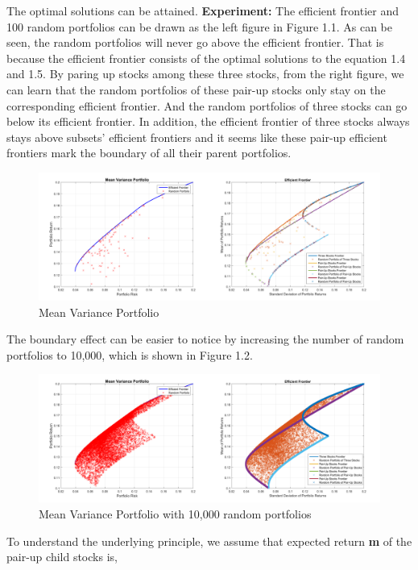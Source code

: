 \documentclass[paper=a4, fontsize=11pt]{article} %
\numberwithin{equation}{section} %
\numberwithin{figure}{section} %
\numberwithin{table}{section} %
\begin{document}
The optimal solutions can be attained.
\newpage
\textbf{Experiment: } The efficient frontier and 100 random portfolios can be drawn as the left figure in Figure 1.1. As can be seen, the random portfolios will never go above the efficient frontier. That is because the efficient frontier consists of the optimal solutions to the equation 1.4 and 1.5. 
By paring up stocks among these three stocks, from the right figure, we can learn that the random portfolios of these pair-up stocks only stay on the corresponding efficient frontier. And the random portfolios of three stocks can go below its efficient frontier. In addition, the efficient frontier of three stocks always stays above subsets' efficient frontiers and it seems like these pair-up efficient frontiers mark the boundary of all their parent portfolios. 
\begin{figure}[h!]
	\centering
	\includegraphics[width=18cm]{fig1_2.png}
	\caption{Mean Variance Portfolio}
\end{figure}

The boundary effect can be easier to notice by increasing the number of random portfolios to 10,000, which is shown in Figure 1.2.

\begin{figure}[h!]
	\centering
	\includegraphics[width=18cm]{fig2_2.png}
	\caption{Mean Variance Portfolio with 10,000 random portfolios}
\end{figure}

To understand the underlying principle, we assume that expected return \textbf{m} of the pair-up child stocks is, 
\end{document}
